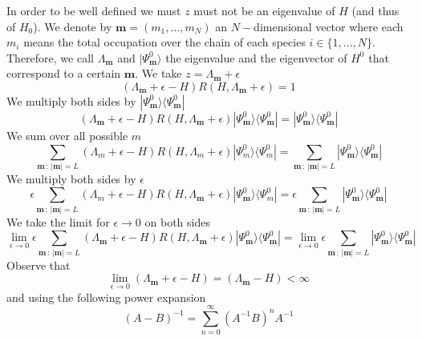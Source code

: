 \documentclass[10pt]{article}
\numberwithin{equation}{section}
\numberwithin{equation}{subsection}
\begin{document}
In order to be well defined we must $z$ must not be an eigenvalue of $H$ (and thus of $H_{0}$). We denote by $\bm{m}=(m_{1},\ldots,m_{N})$ an $N-$dimensional vector where each $m_{i}$ means the total occupation over the chain of each species $i\in\{1,\ldots,N\}$. Therefore, we call $\Lambda_{\bm{m}}$ and $|\Psi_{\bm{m}}^{0}\rangle$ the eigenvalue and the eigenvector of $H^{0}$ that correspond to a certain $\bm{m}$. We take $z=\Lambda_{\bm{m}}+\epsilon$ 
\begin{equation}
	(\Lambda_{\bm{m}}+\epsilon-H)R(H,\Lambda_{\bm{m}}+\epsilon)=1
\end{equation}
We multiply both sides by $|\Psi_{\bm{m}}^{0}\rangle \langle \Psi_{\bm{m}}^{0}|$
\begin{equation}
	(\Lambda_{\bm{m}}+\epsilon-H)R(H,\Lambda_{\bm{m}}+\epsilon)|\Psi_{\bm{m}}^{0}\rangle \langle \Psi_{\bm{m}}^{0}|=|\Psi_{\bm{m}}^{0}\rangle \langle \Psi_{\bm{m}}^{0}|
\end{equation}
We sum over all possible $m$ 
\begin{equation}
	\sum_{\bm{m}\,:\, |\bm{m}|=L}  (\Lambda_{m}+\epsilon-H)R(H,\Lambda_{m}+\epsilon)|\Psi_{m}^{0}\rangle \langle \Psi_{m}^{0}|=\sum_{\bm{m}\,:\, |\bm{m}|=L}|\Psi_{\bm{m}}^{0}\rangle \langle \Psi_{\bm{m}}^{0}|
\end{equation}
We multiply both sides by $\epsilon$ 
\begin{equation}
	\epsilon\sum_{\bm{m}\,:\, |\bm{m}|=L}  (\Lambda_{m}+\epsilon-H)R(H,\Lambda_{\bm{m}}+\epsilon)|\Psi_{\bm{m}}^{0}\rangle \langle \Psi_{m}^{0}|=\epsilon\sum_{\bm{m}\,:\, |\bm{m}|=L}|\Psi_{\bm{m}}^{0}\rangle \langle \Psi_{\bm{m}}^{0}|
\end{equation}
We take the limit for $\epsilon\to 0$ on both sides 
\begin{equation}
	\lim_{\epsilon\to 0}\epsilon\sum_{\bm{m}\,:\, |\bm{m}|=L} (\Lambda_{\bm{m}}+\epsilon-H)R(H,\Lambda_{\bm{m}}+\epsilon)|\Psi_{\bm{m}}^{0}\rangle \langle \Psi_{\bm{m}}^{0}|=\lim_{\epsilon\to 0}\epsilon\sum_{\bm{m}\,:\,|\bm{m}|=L}|\Psi_{\bm{m}}^{0}\rangle \langle \Psi_{\bm{m}}^{0}|
\end{equation}
Observe that 
\begin{equation}
	\lim_{\epsilon\to 0}\left(\Lambda_{\bm{m}}+\epsilon-H\right)=\left(\Lambda_{\bm{m}}-H\right)<\infty
\end{equation}
and using the following power expansion
\begin{equation}\label{veryUsefulSeries}
	(A-B)^{-1}=\sum_{n=0}^{\infty}(A^{-1}B)^{n}A^{-1}
\end{equation}
\end{document}
